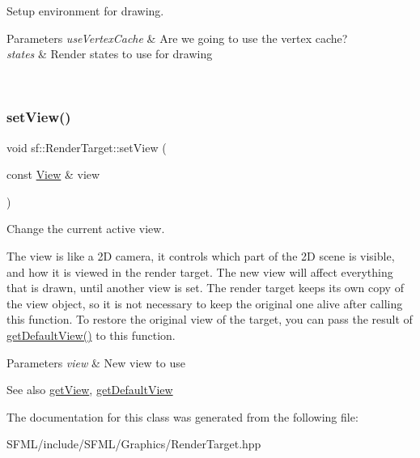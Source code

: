 Setup environment for drawing. 


\begin{DoxyParams}{Parameters}
{\em use\+Vertex\+Cache} & Are we going to use the vertex cache? \\
\hline
{\em states} & Render states to use for drawing \begin{DoxyVerb}\end{DoxyVerb}
 \\
\hline
\end{DoxyParams}
\mbox{\label{classsf_1_1_render_target_a063db6dd0a14913504af30e50cb6d946}} 
\subsubsection{\texorpdfstring{setView()}{setView()}}
{\footnotesize\ttfamily void sf\+::\+Render\+Target\+::set\+View (\begin{DoxyParamCaption}\item[{const \mbox{\hyperlink{classsf_1_1_view}{View}} \&}]{view }\end{DoxyParamCaption})}



Change the current active view. 

The view is like a 2D camera, it controls which part of the 2D scene is visible, and how it is viewed in the render target. The new view will affect everything that is drawn, until another view is set. The render target keeps its own copy of the view object, so it is not necessary to keep the original one alive after calling this function. To restore the original view of the target, you can pass the result of \mbox{\hyperlink{classsf_1_1_render_target_ad3b533c3f899d7044d981ed607aef9be}{get\+Default\+View()}} to this function.


\begin{DoxyParams}{Parameters}
{\em view} & New view to use\\
\hline
\end{DoxyParams}
\begin{DoxySeeAlso}{See also}
\mbox{\hyperlink{classsf_1_1_render_target_a2c179503b4dcdf5282ef6426d317602c}{get\+View}}, \mbox{\hyperlink{classsf_1_1_render_target_ad3b533c3f899d7044d981ed607aef9be}{get\+Default\+View}} \begin{DoxyVerb}\end{DoxyVerb}
 
\end{DoxySeeAlso}


The documentation for this class was generated from the following file\+:\begin{DoxyCompactItemize}
\item 
S\+F\+M\+L/include/\+S\+F\+M\+L/\+Graphics/Render\+Target.\+hpp\end{DoxyCompactItemize}
